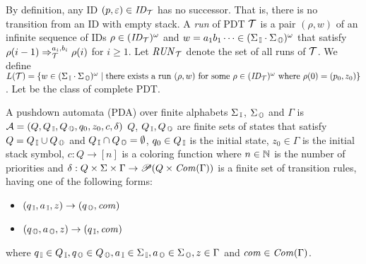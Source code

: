 By definition, any ID $(p, \varepsilon)\in\mathit{ID}_{{\cal T}}$ has
no successor.
That is, there is no transition from an ID with empty stack.
A {\em run} of PDT ${\cal T}$ is a pair $(\rho, w)$ of an infinite sequence of IDs $\rho\in (\mathit{ID}_{\cal T})^\omega$ and $w = a_1 b_1 \cdots \in (\Sigma_{\, \mathbb{I}}\cdot\Sigma_{\, \mathbb{O}})^\omega$ that satisfy $\rho(i-1)\Rightarrow_{\cal T}^{a_i, b_i}\rho(i)$ for $i\geq 1$.
Let $\mathit{RUN}_{\cal T}$ denote the set of all runs of ${\cal T}$.
We define $L({\cal T}) = \{w\in (\Sigma_{\, \mathbb{I}}\cdot\Sigma_{\, \mathbb{O}})^\omega\mid
\text{there exists a run}\allowbreak \text{ $(\rho, w)$ for some $\rho\in(\mathit{ID}_{\cal T})^\omega$ where $\rho(0)=(p_0, z_0)$}\}$.
Let \PDT be the class of complete PDT.


\begin{definition}
A {pushdown automata} (PDA) over finite alphabets $\Sigma_{\, \mathbb{I}}$, $\Sigma_{\, \mathbb{O}}$ and $\Gamma$ is ${\cal A} = (Q, Q_{\, \mathbb{I}}, Q_{\, \mathbb{O}}, q_0, z_0, c, \delta)$
$Q$, $Q_{\, \mathbb{I}}, Q_{\, \mathbb{O}}$ are finite sets of states that satisfy $Q=Q_{\, \mathbb{I}}\cup Q_{\, \mathbb{O}}$ and $Q_{\, \mathbb{I}} \cap Q_{\, \mathbb{O}} = \emptyset$,
$q_0\in Q_{\, \mathbb{I}}$ is the initial state,
$z_0\in \Gamma$ is the initial stack symbol,
$c: Q \to [n]$ is a coloring function where $n\in \mathbb{N}$ is the number of priorities and
$\delta: Q \times \Sigma \times \Gamma \to \mathscr{P}(Q \times \mathit{Com}(\Gamma))$ is a finite set of transition rules, having one of the following forms:
\begin{itemize}
\item $(q_{\, \mathbb{I}}, a_{\, \mathbb{I}}, z) \rightarrow (q_{\, \mathbb{O}}, \mathit{com})$
\item $(q_{\, \mathbb{O}}, a_{\, \mathbb{O}}, z) \rightarrow (q_{\, \mathbb{I}}, \mathit{com})$
\end{itemize}
where $q_{\, \mathbb{I}}\in Q_{\, \mathbb{I}}, q_{\, \mathbb{O}}\in Q_{\, \mathbb{O}}, a_{\, \mathbb{I}}\in \Sigma_{\, \mathbb{I}}, a_{\, \mathbb{O}}\in \Sigma_{\, \mathbb{O}}, z\in \Gamma$ and $\mathit{com}\in \mathit{Com}(\Gamma)$.
\end{definition}

